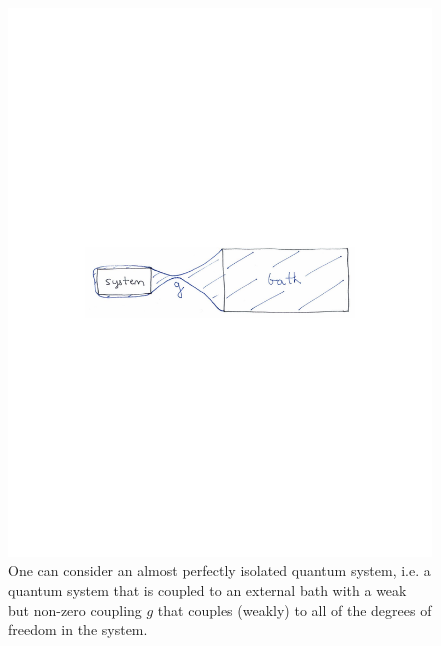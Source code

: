 \documentclass[amsmath,onecolumn, superscriptaddress,preprint,aps]{revtex4}
\begin{document}
\begin{figure}
\includegraphics{Fig4}
\caption{\label{fig4} One can consider an almost perfectly isolated quantum system, i.e. a quantum system that is coupled to an external bath with a
weak but non-zero coupling $g$ that couples (weakly) to all of the degrees of freedom in the system.}
\end{figure}
\end{document}
